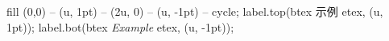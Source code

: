 \begin{mpost*}[mpsettings={u:=\mpdim{0.4\linewidth};}]
fill (0,0) -- (u, 1pt) -- (2u, 0) -- (u, -1pt) -- cycle;
label.top(btex 示例 etex, (u, 1pt));
label.bot(btex \textit{Example} etex, (u, -1pt));
\end{mpost*}
